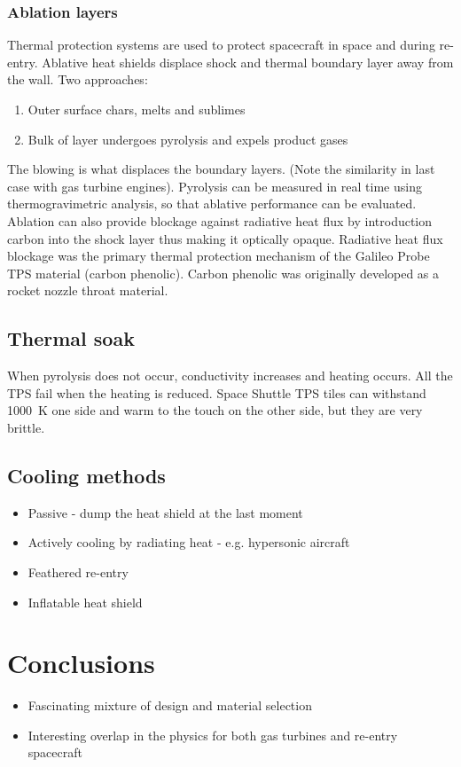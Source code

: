 \subsubsection{Ablation layers}
Thermal protection systems are used to protect spacecraft in space and during re-entry. Ablative heat shields displace shock and thermal boundary layer away from the wall. Two approaches:
\begin{enumerate}
    \item Outer surface chars, melts and sublimes
    \item Bulk of layer undergoes pyrolysis and expels product gases
\end{enumerate}
The blowing is what displaces the boundary layers. (Note the similarity in last case with gas turbine engines). Pyrolysis can be measured in real time using thermogravimetric analysis, so that ablative performance can be evaluated. Ablation can also provide blockage against radiative heat flux by introduction carbon into the shock layer thus making it optically opaque. Radiative heat flux blockage was the primary thermal protection mechanism of the Galileo Probe TPS material (carbon phenolic). Carbon phenolic was originally developed as a rocket nozzle throat material.
\subsection{Thermal soak}
When pyrolysis does not occur, conductivity increases and heating occurs. All the TPS fail when the heating is reduced. Space Shuttle TPS tiles can withstand \SI{1000}{\kelvin} one side and warm to the touch on the other side, but they are very brittle.
\subsection{Cooling methods}
\begin{itemize}
    \item Passive - dump the heat shield at the last moment
    \item Actively cooling by radiating heat - e.g. hypersonic aircraft
    \item Feathered re-entry
    \item Inflatable heat shield
\end{itemize}
\section{Conclusions}
\begin{itemize}
    \item Fascinating mixture of design and material selection
    \item Interesting overlap in the physics for both gas turbines and re-entry spacecraft
\end{itemize}